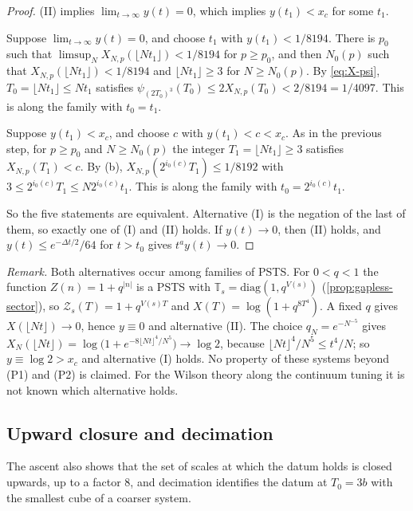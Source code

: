 \documentclass[11pt,a4paper]{amsart}
\theoremstyle{definition}
\theoremstyle{remark}
\numberwithin{equation}{section}
\newcommand{\PSTS}{\textup{PSTS}}          %
\newcommand{\TT}{\mathbb{T}}               %
\newcommand{\Zc}{\mathcal{Z}}              %
\newcommand{\Zs}[2]{\Zc_{#1}(#2)}          %
\newcommand{\psiT}[2]{\psi_{#1}(#2)}       %
\newcommand{\Vol}[1]{V(#1)}                %
\newcommand{\cube}[1]{(2#1)^3}             %
\newcommand{\dconst}{\frac{1}{4097}}       %
\newcommand{\xconst}{\frac{1}{8192}}       %
\newcommand{\dconstinl}{1/4097}            %
\newcommand{\xconstinl}{1/8192}            %
\newcommand{\Mcirc}{\text{\upshape(M$^{\circ}$)}}   %
\newcommand{\Bcirc}{\text{\upshape(B$^{\circ}$)}}   %
\newcommand{\tzero}{t_0}                   %
\begin{document}
\begin{proof}
(II) implies $\lim_{t\to\infty}y(t)=0$, which implies $y(t_1)<x_c$ for some $t_1$.

Suppose $\lim_{t\to\infty}y(t)=0$, and choose $t_1$ with $y(t_1)<1/8194$. There is $p_0$ such that $\limsup_NX_{N,p}(\lfloor Nt_1\rfloor)<1/8194$ for $p\ge p_0$, and then $N_0(p)$ such that $X_{N,p}(\lfloor Nt_1\rfloor)<1/8194$ and $\lfloor Nt_1\rfloor\ge3$ for $N\ge N_0(p)$. By \eqref{eq:X-psi}, $T_0=\lfloor Nt_1\rfloor\le Nt_1$ satisfies $\psiT{\cube{T_0}}{T_0}\le2X_{N,p}(T_0)<2/8194=\dconstinl$. This is \Mcirc{} along the family with $\tzero=t_1$.

Suppose $y(t_1)<x_c$, and choose $c$ with $y(t_1)<c<x_c$. As in the previous step, for $p\ge p_0$ and $N\ge N_0(p)$ the integer $T_1=\lfloor Nt_1\rfloor\ge3$ satisfies $X_{N,p}(T_1)<c$. By (b), $X_{N,p}(2^{i_0(c)}T_1)\le\xconstinl$ with $3\le2^{i_0(c)}T_1\le N2^{i_0(c)}t_1$. This is \Bcirc{} along the family with $\tzero=2^{i_0(c)}t_1$.

So the five statements are equivalent. Alternative (I) is the negation of the last of them, so exactly one of (I) and (II) holds. If $y(t)\to0$, then (II) holds, and $y(t)\le e^{-\Delta t/2}/64$ for $t>\tzero$ gives $t^ay(t)\to0$.
\end{proof}

\noindent\emph{Remark.} Both alternatives occur among families of \PSTS{}. For $0<q<1$ the function $Z(n)=1+q^{|n|}$ is a \PSTS{} with $\TT_s=\mathrm{diag}(1,q^{\Vol{s}})$ (\cref{prop:gapless-sector}), so $\Zs{s}{T}=1+q^{\Vol{s}T}$ and $X(T)=\log(1+q^{8T^4})$. A fixed $q$ gives $X(\lfloor Nt\rfloor)\to0$, hence $y\equiv0$ and alternative (II). The choice $q_N=e^{-N^{-5}}$ gives $X_N(\lfloor Nt\rfloor)=\log\bigl(1+e^{-8\lfloor Nt\rfloor^4/N^5}\bigr)\to\log2$, because $\lfloor Nt\rfloor^4/N^5\le t^4/N$; so $y\equiv\log2>x_c$ and alternative (I) holds. No property of these systems beyond (P1) and (P2) is claimed. For the Wilson theory along the continuum tuning it is not known which alternative holds.

\subsection{Upward closure and decimation}

The ascent also shows that the set of scales at which the datum holds is closed upwards, up to a factor $8$, and decimation identifies the datum at $T_0=3b$ with the smallest cube of a coarser system.
\end{document}
